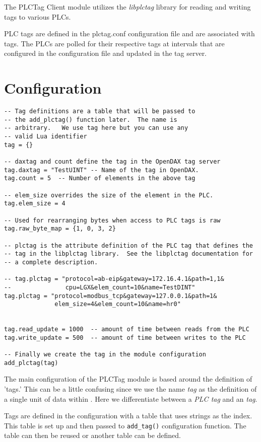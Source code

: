 The PLCTag Client module utilizes the \textit{libplctag} library for reading
and writing tags to various PLCs.

PLC tags are defined in the plctag.conf configuration file and are associated
with \opendax{} tags.  The PLCs are polled for their respective tags at intervals
that are configured in the configuration file and updated in the \opendax{}
tag server.

\section{Configuration}

\begin{verbatim}
-- Tag definitions are a table that will be passed to
-- the add_plctag() function later.  The name is
-- arbitrary.   We use tag here but you can use any
-- valid Lua identifier
tag = {}

-- daxtag and count define the tag in the OpenDAX tag server
tag.daxtag = "TestUINT" -- Name of the tag in OpenDAX.
tag.count = 5  -- Number of elements in the above tag

-- elem_size overrides the size of the element in the PLC.
tag.elem_size = 4

-- Used for rearranging bytes when access to PLC tags is raw
tag.raw_byte_map = {1, 0, 3, 2}

-- plctag is the attribute definition of the PLC tag that defines the
-- tag in the libplctag library.  See the libplctag documentation for
-- a complete description. 

-- tag.plctag = "protocol=ab-eip&gateway=172.16.4.1&path=1,1&
--               cpu=LGX&elem_count=10&name=TestDINT"
tag.plctag = "protocol=modbus_tcp&gateway=127.0.0.1&path=1&
              elem_size=4&elem_count=10&name=hr0"


tag.read_update = 1000  -- amount of time between reads from the PLC
tag.write_update = 500  -- amount of time between writes to the PLC

-- Finally we create the tag in the module configuration
add_plctag(tag)
\end{verbatim}

The main configuration of the PLCTag module is based around the 
definition of 'tags.'  This can be a little confusing since we
use the name \textit{tag} as the definition of a single unit of
data within \opendax{}.  Here we differentiate between a \textit{PLC tag} and
an \opendax{} \textit{tag}.

Tags are defined in the configuration with a table that uses
strings as the index.  This table is set up and then passed to
\texttt{add\_tag()} configuration function.  The table can then
be reused or another table can be defined.

